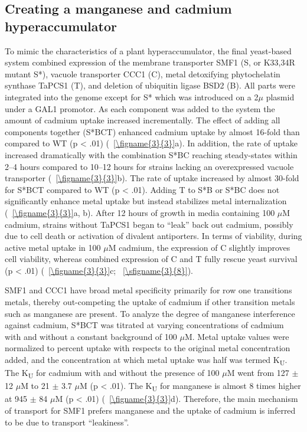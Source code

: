 \documentclass[../main/main]{subfiles}
\begin{document}
\subsection{Creating a manganese and cadmium hyperaccumulator}
To mimic the characteristics of a plant hyperaccumulator, the final yeast-based system combined expression of the membrane transporter SMF1 (S, or K33,34R mutant S*), vacuole transporter CCC1 (C), metal detoxifying phytochelatin synthase TaPCS1 (T), and deletion of ubiquitin ligase BSD2 (B). All parts were integrated into the genome except for S* which was introduced on a 2$\mu$ plasmid under a GAL1 promotor. As each component was added to the system the amount of cadmium uptake increased incrementally. The effect of adding all components together (S*BCT) enhanced cadmium uptake by almost 16-fold than compared to WT (p < .01) (\FIGURE~\ref{\figname{3}{3}}a). In addition, the rate of uptake increased dramatically with the combination S*BC reaching steady-states within 2--4 hours compared to 10--12 hours for strains lacking an overexpressed vacuole transporter (\FIGURE~\ref{\figname{3}{3}}b). The rate of uptake increased by almost 30-fold for S*BCT compared to WT (p < .01). Adding T to S*B or S*BC does not significantly enhance metal uptake but instead stabilizes metal internalization (\FIGURE~\ref{\figname{3}{3}}a, b). After 12 hours of growth in media containing 100 $\mu$M cadmium, strains without TaPCS1 began to ``leak'' back out cadmium, possibly due to cell death or activation of divalent antiporters.
In terms of viability, during active metal uptake in 100 $\mu$M cadmium, the expression of C slightly improves cell viability, whereas combined expression of C and T fully rescue yeast survival (p < .01) (\FIGURE~\ref{\figname{3}{3}}c; \sFIGURE~\ref{\sfigname{3}{8}}).

SMF1 and CCC1 have broad metal specificity primarily for row one transitions metals, thereby out-competing the uptake of cadmium if other transition metals such as manganese are present. To analyze the degree of manganese interference against cadmium, S*BCT was titrated at varying concentrations of cadmium with and without a constant background of 100 $\mu$M. Metal uptake values were normalized to percent uptake with respects to the original metal concentration added, and the concentration at which metal uptake was half was termed K\textsubscript{U}. The K\textsubscript{U} for cadmium with and without the presence of 100 $\mu$M went from 127 $\pm$ 12 $\mu$M to 21 $\pm$ 3.7 $\mu$M (p < .01). The K\textsubscript{U} for manganese is almost 8 times higher at  945 $\pm$ 84 $\mu$M (p < .01) (\FIGURE~\ref{\figname{3}{3}}d). Therefore, the main mechanism of transport for SMF1 prefers manganese and the uptake of cadmium is inferred to be due to transport ``leakiness''.
\end{document}

